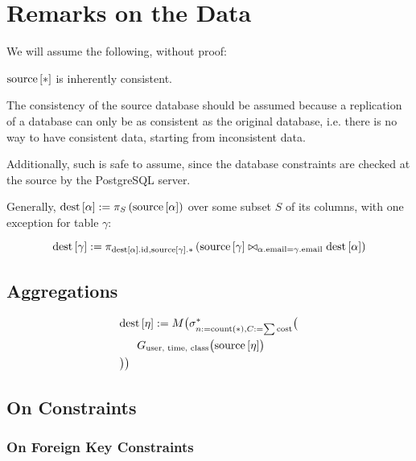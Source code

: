 \chapter{Remarks on the Data}
\label{ch:data}

\newcommand{\ind}{\ensuremath{\phantom{= =}}}


We will assume the following, without proof:

\begin{axiom}
	$\text{source}\left[{*}\right]$ is inherently consistent.
\end{axiom}

The consistency of the source database should be assumed because a replication of a database can only be as consistent as the original database, i.e. there is no way to have consistent data, starting from inconsistent data.

Additionally, such is safe to assume, since the database constraints are checked at the source by the PostgreSQL server.

Generally, 
$\text{dest}\left[{\alpha}\right] := \pi_{S}\left(\text{source}\left[{\alpha}\right]\right)$
over some subset $S$ of its columns,
with one exception for table $\gamma$:

$$
\text{dest}\left[{\gamma}\right] := \pi_{\text{dest}\left[{\alpha}\right].\text{id}, \text{source}\left[{\gamma}\right].*}
\left(
\text{source}\left[{\gamma}\right] \bowtie_{\alpha.\text{email} = \gamma.\text{email}} \text{dest}\left[{\alpha}\right]
\right)
$$


\section{Aggregations}

\begin{align}
&\dest{\eta} := M\bigl(\sigma^*_{n := \text{count}(*), C := \sum\text{cost}} \bigl( \nonumber \\
&\ind G_{\text{user, time, class}} \bigl(\source{\eta}\bigr) \nonumber \\
&\bigr)\bigr) \nonumber
\end{align}


\section{On Constraints}
\subsection{On Foreign Key Constraints}

